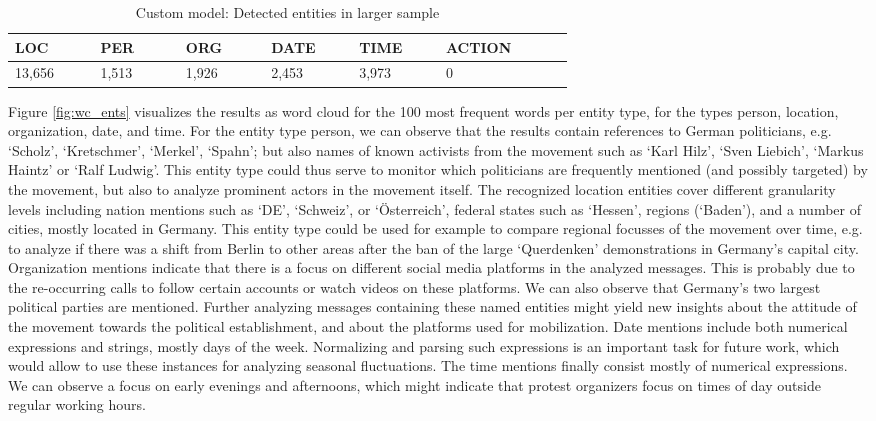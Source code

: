 \begin{table}[htp]
\caption{Custom model: Detected entities in larger sample}
\label{tab:detected_ents_large_sample}
\centering
\begin{adjustbox}{max width=\textwidth}
\begin{tabular}{|p{0.1\linewidth}|p{0.1\linewidth}|p{0.1\linewidth}|p{0.1\linewidth}|p{0.1\linewidth}|p{0.15\linewidth}|}
\hline
\textbf{LOC} & \textbf{PER} & \textbf{ORG}& \textbf{DATE} & \textbf{TIME} & \textbf{ACTION}\\ \hline 
13,656 & 1,513 & 1,926 &  2,453 & 3,973 & 0 \\ \hline
\end{tabular}
\end{adjustbox}
\end{table}

Figure \ref{fig:wc_ents} visualizes the results as word cloud for the 100 most frequent words per entity type, for the types person, location, organization, date, and time.
For the entity type person, we can observe that the results contain references to German politicians, e.g. `Scholz', `Kretschmer', `Merkel', `Spahn'; but also names of known activists from the movement such as `Karl Hilz', `Sven Liebich', `Markus Haintz' or `Ralf Ludwig'. This entity type could thus serve to monitor which politicians are frequently mentioned (and possibly targeted) by the movement, but also to analyze prominent actors in the movement itself. 
The recognized location entities cover different granularity levels including nation mentions such as `DE', `Schweiz', or `\"Osterreich', federal states such as `Hessen', regions (`Baden'), and a number of cities, mostly located in Germany. This entity type could be used for example to compare regional focusses of the movement over time, e.g. to analyze if there was a shift from Berlin to other areas after the ban of the large `Querdenken' demonstrations in Germany's capital city. 
Organization mentions indicate that there is a focus on different social media platforms in the analyzed messages. This is probably due to the re-occurring calls to follow certain accounts or watch videos on these platforms. We can also observe that Germany's two largest political parties are mentioned. Further analyzing messages containing these named entities might yield new insights about the attitude of the movement towards the political establishment, and about the platforms used for mobilization. 
Date mentions include both numerical expressions and strings, mostly days of the week. Normalizing and parsing such expressions is an important task for future work, which would allow to use these instances for analyzing seasonal fluctuations. The time mentions finally consist mostly of numerical expressions. We can observe a focus on early evenings and afternoons, which might indicate that protest organizers focus on times of day outside regular working hours. 

